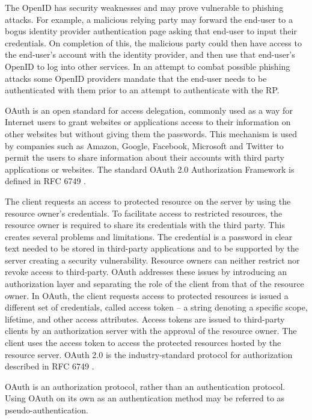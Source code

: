 \begin{multicols}{2}
The OpenID has security weaknesses and may prove vulnerable to phishing attacks. For example, a malicious relying party may forward the end-user to a bogus identity provider authentication page asking that end-user to input their credentials. On completion of this, the malicious party could then have access to the end-user's account with the identity provider, and then use that end-user's OpenID to log into other services. In an attempt to combat possible phishing attacks some OpenID providers mandate that the end-user needs to be authenticated with them prior to an attempt to authenticate with the RP.

OAuth is an open standard for access delegation, commonly used as a way for Internet users to grant websites or applications access to their information on other websites but without giving them the passwords. This mechanism is used by companies such as Amazon, Google, Facebook, Microsoft and Twitter to permit the users to share information about their accounts with third party applications or websites. The standard OAuth 2.0 Authorization Framework is defined in RFC 6749 \cite{chap2-key26}.

The client requests an access to protected resource on the server by using the resource owner's credentials. To facilitate access to restricted resources, the resource owner is required to share its credentials with the third party. This creates several problems and limitations. The credential is a password in clear text needed to be stored in third-party applications and to be supported by the server creating a security vulnerability. Resource owners can neither restrict nor revoke access to third-party. OAuth addresses these issues by introducing an authorization layer and separating the role of the client from that of the resource owner. In OAuth, the client requests access to protected resources is issued a different set of credentials, called access token -- a string denoting a specific scope, lifetime, and other access attributes. Access tokens are issued to third-party clients by an authorization server with the  approval of the resource owner. The client uses the access token to access the protected resources hosted by the resource server. OAuth 2.0 is the industry-standard protocol for authorization described in RFC 6749 \cite{chap2-key21}.

OAuth is an authorization protocol, rather than an authentication protocol. Using OAuth on its own as an authentication method may be referred to as pseudo-authentication. 
\medskip


\end{multicols}
